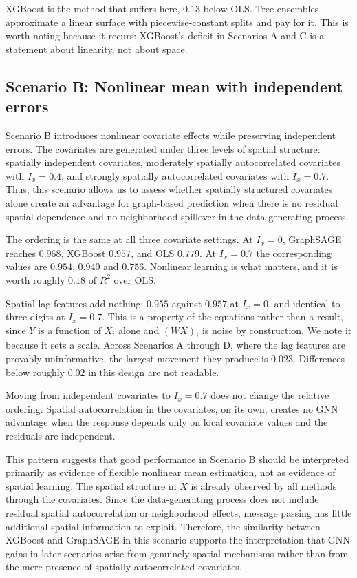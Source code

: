 \documentclass[ASNA, twocolumn]{USG} %
\begin{document}
XGBoost is the method that suffers here, \(0.13\) below OLS. Tree ensembles approximate a linear surface with piecewise-constant splits and pay for it. This is worth noting because it recurs: XGBoost's deficit in Scenarios A and C is a statement about linearity, not about space.

\subsection{Scenario B: Nonlinear mean with independent errors}

Scenario B introduces nonlinear covariate effects while preserving independent errors. The covariates are generated under three levels of spatial structure: spatially independent covariates, moderately spatially autocorrelated covariates with \(I_x=0.4\), and strongly spatially autocorrelated covariates with \(I_x=0.7\). Thus, this scenario allows us to assess whether spatially structured covariates alone create an advantage for graph-based prediction when there is no residual spatial dependence and no neighborhood spillover in the data-generating process.

The ordering is the same at all three covariate settings. At \(I_x=0\), GraphSAGE reaches \(0.968\), XGBoost \(0.957\), and OLS \(0.779\). At \(I_x=0.7\) the corresponding values are \(0.954\), \(0.940\) and \(0.756\). Nonlinear learning is what matters, and it is worth roughly \(0.18\) of \(R^2\) over OLS.

Spatial lag features add nothing: \(0.955\) against \(0.957\) at \(I_x=0\), and identical to three digits at \(I_x=0.7\). This is a property of the equations rather than a result, since \(Y\) is a function of \(X_i\) alone and \((WX)_i\) is noise by construction. We note it because it sets a scale. Across Scenarios A through D, where the lag features are provably uninformative, the largest movement they produce is \(0.023\). Differences below roughly \(0.02\) in this design are not readable.

Moving from independent covariates to \(I_x=0.7\) does not change the relative ordering. Spatial autocorrelation in the covariates, on its own, creates no GNN advantage when the response depends only on local covariate values and the residuals are independent.

This pattern suggests that good performance in Scenario B should be interpreted primarily as evidence of flexible nonlinear mean estimation, not as evidence of spatial learning. The spatial structure in \(X\) is already observed by all methods through the covariates. Since the data-generating process does not include residual spatial autocorrelation or neighborhood effects, message passing has little additional spatial information to exploit. Therefore, the similarity between XGBoost and GraphSAGE in this scenario supports the interpretation that GNN gains in later scenarios arise from genuinely spatial mechanisms rather than from the mere presence of spatially autocorrelated covariates.
\end{document}
